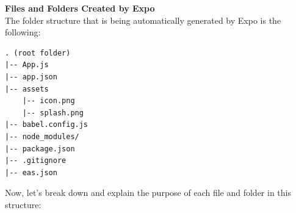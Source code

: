 \vspace{5mm}

\noindent \textbf{Files and Folders Created by Expo} \\
The folder structure that is being automatically generated by Expo is the following:

\vspace{5mm}

\begin{lstlisting}[caption=Expo Project Folder Structure]
. (root folder)
|-- App.js
|-- app.json
|-- assets
    |-- icon.png
    |-- splash.png
|-- babel.config.js
|-- node_modules/
|-- package.json
|-- .gitignore
|-- eas.json
\end{lstlisting}

\vspace{5mm}

\noindent Now, let's break down and explain the purpose of each file and folder in this structure:

